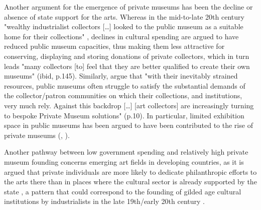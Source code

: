 \documentclass[11pt, authoryear]{elsarticle}
\begin{document}
Another argument for the emergence of private museums has been the decline or absence of state support for the arts. 
Whereas in the mid-to-late 20th century "wealthy industrialist collectors [\ldots{}] looked to the public museum as a suitable home for their collections" \citep[p.144]{Walker_2019_collector}, declines in cultural spending are argued to have reduced public museum capacities, thus making them less attractive for conserving, displaying and storing donations of private collectors, which in turn leads "many collectors [to] feel that they are better qualified to create their own museums" (ibid, p.145).
Similarly, \citet{Boloten_Hacking_2021_foreword} argue that "with their inevitably strained resources, public museums often struggle to satisfy the substantial demands of the collector/patron communities on which their collections, and institutions, very much rely. Against this backdrop [\ldots{}] [art collectors] are increasingly turning to bespoke Private Museum solutions" (p.10).
In particular, limited exhibition space in public museums has been argued to have been contributed to the rise of private museums (\citealt[p.217]{Walker_2019_collector}, \citealt[p.1]{Zorloni_Resch_2016_opportunities}). 



Another pathway between low government spending and relatively high private museum founding concerns emerging art fields in developing countries, as it is argued that private individuals are more likely to dedicate philanthropic efforts to the arts there than in places where the cultural sector is already supported by the state \citep{Durand_2018_jumex,Bechtler_Imhof_2018_future,Boloten_Hacking_2021_foreword}, a pattern that could correspond to the founding of gilded age cultural institutions by industrialists in the late 19th/early 20th century \citep{diMaggio_1982_boston}.
\end{document}
